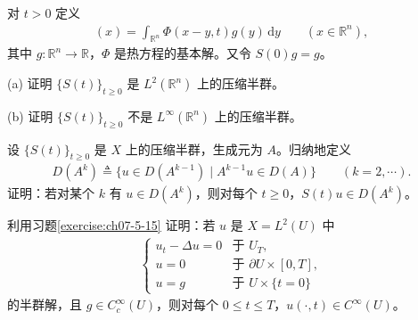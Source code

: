 \documentclass[../../main.tex]{subfiles}
\begin{document}
\begin{exercise}\label{exercise:ch07-5-14}
对 $t>0$ 定义
\begin{align*}
[S(t)g](x)=\int_{\mathbb{R}^n}\Phi(x-y,t)g(y)\,\mathrm{d}y\qquad (x\in\mathbb{R}^n),
\end{align*}
其中 $g:\mathbb{R}^n\to\mathbb{R}$，$\Phi$ 是热方程的基本解。又令 $S(0)g=g$。

(a) 证明 $\{S(t)\}_{t\geqslant 0}$ 是 $L^2(\mathbb{R}^n)$ 上的压缩半群。

(b) 证明 $\{S(t)\}_{t\geqslant 0}$ 不是 $L^\infty(\mathbb{R}^n)$ 上的压缩半群。
\end{exercise}

\begin{exercise}\label{exercise:ch07-5-15}
设 $\{S(t)\}_{t\geqslant 0}$ 是 $X$ 上的压缩半群，生成元为 $A$。归纳地定义
\begin{align*}
D(A^k)\triangleq \{u\in D(A^{k-1})\mid A^{k-1}u\in D(A)\}\qquad (k=2,\cdots).
\end{align*}
证明：若对某个 $k$ 有 $u\in D(A^k)$，则对每个 $t\geqslant 0$，$S(t)u\in D(A^k)$。
\end{exercise}

\begin{exercise}\label{exercise:ch07-5-16}
利用习题\cref{exercise:ch07-5-15} 证明：若 $u$ 是 $X=L^2(U)$ 中
\begin{align*}
\begin{cases}
u_t-\Delta u=0 & \text{于 } U_T,\\
u=0 & \text{于 } \partial U\times[0,T],\\
u=g & \text{于 } U\times\{t=0\}
\end{cases}
\end{align*}
的半群解，且 $g\in C_c^\infty(U)$，则对每个 $0\leqslant t\leqslant T$，$u(\cdot,t)\in C^\infty(U)$。
\end{exercise}
\end{document}
